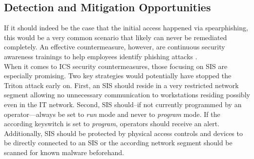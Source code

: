 \documentclass[runningheads]{llncs}
\begin{document}
\subsection{Detection and Mitigation Opportunities}
\label{subsection:triton-detection-mitigation}
If it should indeed be the case that the initial access happened via spearphishing, this would be a very common scenario that likely can never be remediated completely.
An effective countermeasure, however, are continuous security awareness trainings to help employees identify phishing attacks \cite{arachchilage.14}.\\
When it comes to ICS security countermeasures, those focusing on SIS are especially promising.
Two key strategies would potentially have stopped the Triton attack early on.
First, an SIS should reside in a very restricted network segment allowing no unnecessary communication to workstations residing possibly even in the IT network.
Second, SIS should--if not currently programmed by an operator---always be set to \textit{run} mode and never to \textit{program} mode.
If the according keyswitch is set to \textit{program}, operators should receive an alert.
Additionally, SIS should be protected by physical access controls and devices to be directly connected to an SIS or the according network segment should be scanned for known malware beforehand. \cite{dragos.17}
\end{document}
